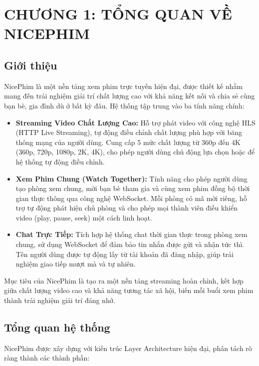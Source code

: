 \newpage

\section{CHƯƠNG 1: TỔNG QUAN VỀ NICEPHIM}

\subsection{Giới thiệu}

NicePhim là một nền tảng xem phim trực tuyến hiện đại, được thiết kế nhằm mang đến trải nghiệm giải trí chất lượng cao với khả năng kết nối và chia sẻ cùng bạn bè, gia đình dù ở bất kỳ đâu. Hệ thống tập trung vào ba tính năng chính:

\begin{itemize}
	\item \textbf{Streaming Video Chất Lượng Cao:} Hỗ trợ phát video với công nghệ HLS (HTTP Live Streaming), tự động điều chỉnh chất lượng phù hợp với băng thông mạng của người dùng. Cung cấp 5 mức chất lượng từ 360p đến 4K (360p, 720p, 1080p, 2K, 4K), cho phép người dùng chủ động lựa chọn hoặc để hệ thống tự động điều chỉnh.

	\item \textbf{Xem Phim Chung (Watch Together):} Tính năng cho phép người dùng tạo phòng xem chung, mời bạn bè tham gia và cùng xem phim đồng bộ thời gian thực thông qua công nghệ WebSocket. Mỗi phòng có mã mời riêng, hỗ trợ tự động phát hiện chủ phòng và cho phép mọi thành viên điều khiển video (play, pause, seek) một cách linh hoạt.

	\item \textbf{Chat Trực Tiếp:} Tích hợp hệ thống chat thời gian thực trong phòng xem chung, sử dụng WebSocket để đảm bảo tin nhắn được gửi và nhận tức thì. Tên người dùng được tự động lấy từ tài khoản đã đăng nhập, giúp trải nghiệm giao tiếp mượt mà và tự nhiên.
\end{itemize}

Mục tiêu của NicePhim là tạo ra một nền tảng streaming hoàn chỉnh, kết hợp giữa chất lượng video cao và khả năng tương tác xã hội, biến mỗi buổi xem phim thành trải nghiệm giải trí đáng nhớ.

\subsection{Tổng quan hệ thống}

NicePhim được xây dựng với kiến trúc Layer Architecture hiện đại, phân tách rõ ràng thành các thành phần:

